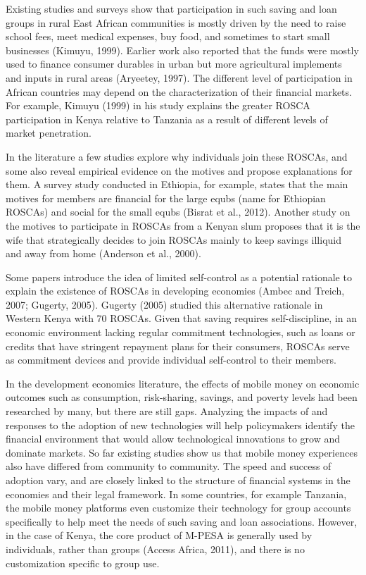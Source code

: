 \documentclass[11pt]{article}
\numberwithin{equation}{section}
\begin{document}
Existing studies and surveys show that participation in such saving and loan groups in rural East African communities is mostly driven by the need to raise school fees, meet medical expenses, buy food, and sometimes to start small businesses (Kimuyu, 1999). Earlier work also reported that the funds were mostly used to finance consumer durables in urban but more agricultural implements and inputs in rural areas (Aryeetey, 1997). The different level of participation in African countries may depend on the characterization of their financial markets. For example, Kimuyu (1999) in his study explains the greater ROSCA participation in Kenya relative to Tanzania as a result of different levels of market penetration. 

In the literature a few studies explore why individuals join these ROSCAs, and some also reveal empirical evidence on the motives and propose explanations for them. A survey study conducted in Ethiopia, for example, states that the main motives for members are financial for the large equbs (name for Ethiopian ROSCAs) and social for the small equbs (Bisrat et al., 2012). Another study on the motives to participate in ROSCAs from a Kenyan slum proposes that it is the wife that strategically decides to join ROSCAs mainly to keep savings illiquid and away from home (Anderson et al., 2000). 

Some papers introduce the idea of limited self-control as a potential rationale to explain the existence of ROSCAs in developing economies (Ambec and Treich, 2007; Gugerty, 2005). Gugerty (2005) studied this alternative rationale in Western Kenya with 70 ROSCAs. Given that saving requires self-discipline, in an economic environment lacking regular commitment technologies, such as loans or credits that have stringent repayment plans for their consumers, ROSCAs serve as commitment devices and provide individual self-control to their members. 

In the development economics literature, the effects of mobile money on economic outcomes such as consumption, risk-sharing, savings, and poverty levels had been researched by many, but there are still gaps. Analyzing the impacts of and responses to the adoption of new technologies will help policymakers identify the financial environment that would allow technological innovations to grow and dominate markets. So far existing studies show us that mobile money experiences also have differed from community to community. The speed and success of adoption vary, and are closely linked to the structure of financial systems in the economies and their legal framework. In some countries, for example Tanzania, the mobile money platforms even customize their technology for group accounts specifically to help meet the needs of such saving and loan associations. However, in the case of Kenya, the core product of M-PESA is generally used by individuals, rather than groups (Access Africa, 2011), and there is no customization specific to group use.
\end{document}
